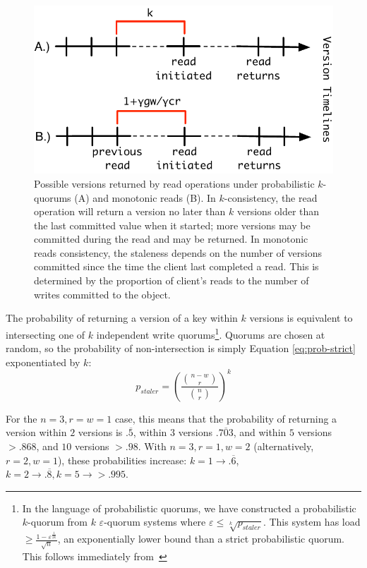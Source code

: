 \documentclass{vldb}
\begin{document}
\begin{figure}
\centering
\includegraphics[width=\columnwidth]{figs/timelines.pdf}
\caption{Possible versions returned by read operations under
  probabilistic $k$-quorums (A) and monotonic reads (B). In
  $k$-consistency, the read operation will return a version no later
  than $k$ versions older than the last committed value when it
  started; more versions may be committed during the read and may be
  returned.  In monotonic reads consistency, the staleness depends on
  the number of versions committed since the time the client last
  completed a read.  This is determined by the proportion of client's
  reads to the number of writes committed to the object.}
\label{fig:timelines}
\end{figure}

The probability of returning a version of a key within $k$ versions is
equivalent to intersecting one of $k$ independent write
quorums\footnote{In the language of probabilistic quorums, we have
  constructed a probabilistic $k$-quorum from $k$ $\varepsilon$-quorum
  systems where $\varepsilon \leq \sqrt[k]{p_{staler}}$. This system
  has load $\geq \frac{1-\varepsilon^{\frac{1}{2k}}}{\sqrt{n}}$, an
  exponentially lower bound than a strict probabilistic quorum.  This
  follows immediately from~\cite[Corollary 3.12]{prob-quorum}}.
Quorums are chosen at random, so the probability of non-intersection
is simply Equation \ref{eq:prob-strict} exponentiated by $k$:
\begin{equation}
\label{eq:k-consistency}
p_{staler} = \left(\frac{{n-w \choose r}}{{n \choose r}}\right)^k
\end{equation}

For the $n=3, r=w=1$ case, this means that the probability of
returning a version within $2$ versions is $.\overline{5}$, within $3$
versions $.\overline{703}$, and within $5$ versions $> .868$, and $10$
versions $>.98$.  With $n=3, r=1, w=2$ (alternatively, $r=2, w=1$),
these probabilities increase: $k=1 \rightarrow
.\overline{6}$, $k=2 \rightarrow .\overline{8}, k=5 \rightarrow >
.995$.
\end{document}
